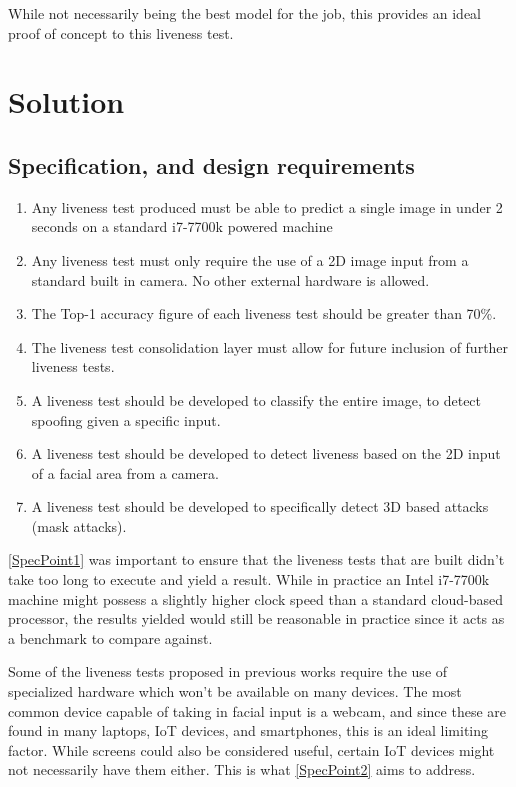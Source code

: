 \documentclass[12pt,a4paper]{article}
\begin{document}
            While not necessarily being the best model for the job, this provides an ideal proof of concept to this liveness test.
             

\section{Solution}
    \subsection{Specification, and design requirements}
        \begin{enumerate}
            \item \label{SpecPoint1} Any liveness test produced must be able to predict a single image in under 2 seconds on a standard i7-7700k powered machine
            \item \label{SpecPoint2} Any liveness test must only require the use of a 2D image input from a standard built in camera. No other external hardware is allowed.
            \item \label{SpecPoint3} The Top-1 accuracy figure of each liveness test should be greater than 70\%.
            \item \label{SpecPoint4} The liveness test consolidation layer must allow for future inclusion of further liveness tests.
            \item \label{SpecPoint5} A liveness test should be developed to classify the entire image, to detect spoofing given a specific input.
            \item \label{SpecPoint6} A liveness test should be developed to detect liveness based on the 2D input of a facial area from a camera.
            \item \label{SpecPoint7} A liveness test should be developed to specifically detect 3D based attacks (mask attacks).
        \end{enumerate}

        \ref{SpecPoint1} was important to ensure that the liveness tests that are built didn't take too long to execute and yield a result. While in practice an Intel i7-7700k machine might possess a
        slightly higher clock speed than a standard cloud-based processor, the results yielded would still be reasonable in practice since it acts as a benchmark to compare against.

        Some of the liveness tests proposed in previous works require the use of specialized hardware which won't be available on many devices. The most common device capable of taking in facial input is a
        webcam, and since these are found in many laptops, IoT devices, and smartphones, this is an ideal limiting factor. While screens could also be considered useful, certain IoT devices might not necessarily have them either.
        This is what \ref{SpecPoint2} aims to address.
\end{document}

